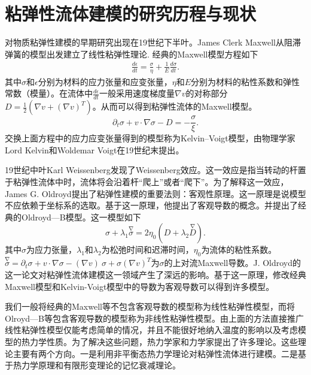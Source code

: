 \section{粘弹性流体建模的研究历程与现状}
对物质粘弹性建模的早期研究出现在19世纪下半叶。James Clerk Maxwell从阻滞弹簧的模型出发建立了线性粘弹性理论\cite{maxwell2013scientific}. 经典的Maxwell模型方程如下
\begin{eqnarray*}
\frac {d\epsilon} {dt} = \frac {\sigma} {\eta} + \frac {1} {E} \frac {d\sigma} {dt}.
\end{eqnarray*}
其中$\sigma$和$\epsilon$分别为材料的应力张量和应变张量，$\eta$和$E$分别为材料的粘性系数和弹性常数（模量）。在流体中$\frac {d\epsilon} {dt}$一般采用速度梯度量$\nabla v$的对称部分$D=\frac{1}{2} (\nabla v + (\nabla v)^T)$。从而可以得到粘弹性流体的Maxwell模型。
\begin{equation} \label{eq:maxwell}
			\partial_t \sigma + v \cdot \nabla \sigma - D = -\frac{\sigma}{\xi}. 
\end{equation}
交换上面方程中的应力应变张量得到的模型称为Kelvin–Voigt模型，由物理学家Lord Kelvin和Woldemar Voigt在19世纪末提出\cite{kelvin1887stability}。

19世纪中叶Karl Weissenberg发现了Weissenberg效应。这一效应是指当转动的杆置于粘弹性流体中时，流体将会沿着杆“爬上”或者“爬下”\cite{weissenberg1947continuum}。为了解释这一效应，James G. Oldroyd提出了粘弹性建模的重要法则：客观性原理。这一原理是说模型不应依赖于坐标系的选取。基于这一原理，他提出了客观导数的概念。并提出了经典的Oldroyd—B模型。这一模型如下
\begin{equation} \label{eq:Oldroyd}
	{\sigma} + \lambda_1 \stackrel{\nabla}{{\sigma}} = 2\eta_0 ({D} + \lambda_2 \stackrel{\nabla}{{D}}).
\end{equation}
其中$\sigma$为应力张量，$\lambda_1$和$\lambda_2$为松弛时间和迟滞时间，$\eta_0$为流体的粘性系数。${\stackrel{\nabla} \sigma}= \partial_t \sigma + v \cdot \nabla \sigma - (\nabla v)\  \sigma + \sigma (\nabla v)^T$为$\sigma$的上对流Maxwell导数\cite{oldroyd1950formulation}。J. Oldroyd的这一论文对粘弹性流体建模这一领域产生了深远的影响。基于这一原理，修改经典Maxwell模型和Kelvin-Voigt模型中的导数为客观导数可以得到许多模型\cite{lin2005hydrodynamics,larson1999structure}。

我们一般将经典的Maxwell等不包含客观导数的模型称为线性粘弹性模型，而将Olroyd—B等包含客观导数的模型称为非线性粘弹性模型。由上面的方法直接推广线性粘弹性模型仅能考虑简单的情况，并且不能很好地纳入温度的影响以及考虑模型的热力学性质。为了解决这些问题，热力学家和力学家提出了许多理论。这些理论主要有两个方向。一是利用非平衡态热力学理论对粘弹性流体进行建模\cite{jou1996extended,ottinger2005beyond,zhu2014conservation}。二是基于热力学原理和有限形变理论的记忆衰减理论\cite{coleman1961foundations,truesdell2012rational}。

